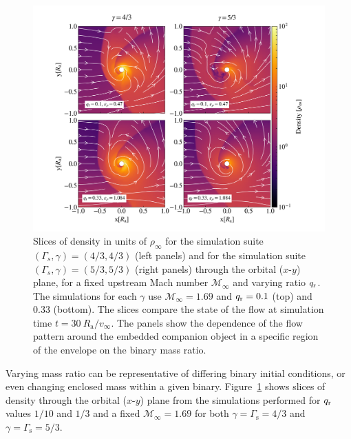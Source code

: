 \begin{figure}
\centering
\includegraphics[width=16cm]{figures/common_envelope/sliceplot_gamma_43_53_mach1pt69_varyq_gradient_comparison_figure_z.pdf}
\caption{Slices of density in units of $\rho_\infty$ for the simulation suite $(\Gamma_s, \gamma) = (4/3, 4/3)$ (left panels) and for the simulation suite $(\Gamma_s, \gamma) = (5/3, 5/3)$ (right panels) through the orbital ($x$-$y$) plane, for a fixed upstream Mach number $\mathcal{M}_\infty$ and varying ratio $q_{\rm r}$. The simulations for each $\gamma$ use $\mathcal{M}_\infty = 1.69$ and $q_{\rm r}=0.1$ (top) and 0.33 (bottom). The slices compare the state of the flow at simulation time $t = 30~R_{\mathrm{a}}/v_\infty$. The panels show the dependence of the flow pattern around the embedded companion object in a specific region of the envelope on the binary mass ratio. \label{fig:sims_fix_mach_vary_q}}
\vspace*{8mm}
\end{figure}

Varying mass ratio can be representative of differing binary initial conditions, or even changing enclosed mass within a given binary.  
Figure~\ref{fig:sims_fix_mach_vary_q} shows slices of density  through the orbital ($x$-$y$) plane from the simulations performed for $q_{\rm r}$ values $1/10$ and $1/3$ and a fixed $\mathcal{M}_\infty = 1.69$ for both $\gamma=\Gamma_{\mathrm s}=4/3$ and $\gamma=\Gamma_{\mathrm s}=5/3$.


